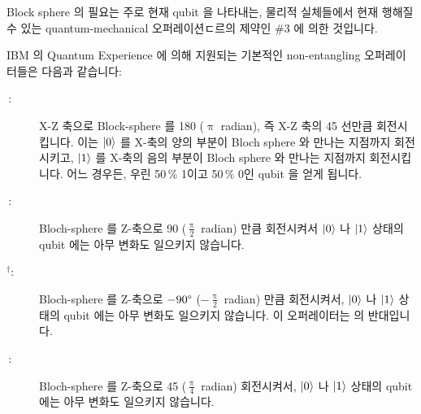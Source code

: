 Block sphere 의 필요는 주로 현재 qubit 을 나타내는, 물리적 실체들에서 현재
행해질 수 있는 quantum-mechanical 오퍼레이션ㄷ르의 제약인 \#3 에 의한 것입니다.

IBM 의 Quantum Experience 에 의해 지원되는 기본적인 non-entangling
오퍼레이터들은 다음과 같습니다:

\begin{description}
\item[\,:]
	X-Z 축으로 Block-sphere 를 180\degree{} ($\uppi$ radian), 즉 X-Z 축의
	45\degree{} 선만큼 회전시킵니다.  이는 $\ket{0}$ 를 X-축의 양의 부분이
	Bloch sphere 와 만나는 지점까지 회전시키고, $\ket{1}$ 를 X-축의 음의
	부분이 Bloch sphere 와 만나는 지점까지 회전시킵니다.
	어느 경우든, 우린 50\,\% 1이고 50\,\% 0인 qubit 을 얻게 됩니다.

\item[\,:]
	Bloch-sphere 를 Z-축으로 90\degree{} ($\frac{\uppi}{2}$ radian) 만큼
	회전시켜서 $\ket{0}$ 나 $\ket{1}$ 상태의 qubit 에는 아무 변화도
	일으키지 않습니다.

\item[$^{\bm{\dagger}}$:]
	Bloch-sphere 를 Z-축으로 $-90\degree$ ($-\frac{\uppi}{2}$ radian) 만큼
	회전시켜서, $\ket{0}$ 나 $\ket{1}$ 상태의 qubit 에는 아무 변화도
	일으키지 않습니다.
	이 오퍼레이터는  의 반대입니다.

\item[\,:]
	Bloch-sphere 를 Z-축으로 45\degree{} ($\frac{\uppi}{4}$ radian)
	회전시켜서, $\ket{0}$ 나 $\ket{1}$ 상태의 qubit 에는 아무 변화도
	일으키지 않습니다.
	\iffalse


\end{description}
